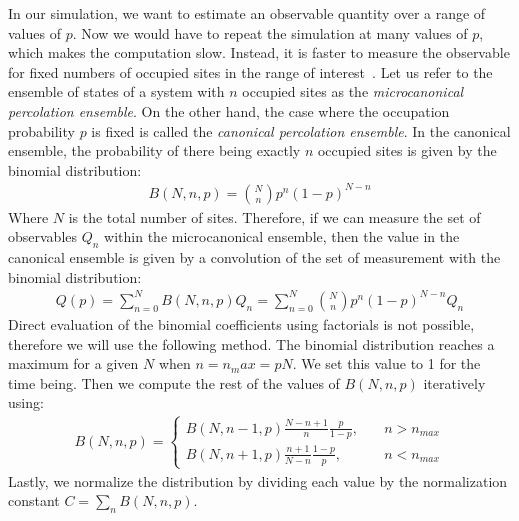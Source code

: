 In our simulation, we want to estimate an observable quantity over a range of values of $p$. Now we would have to repeat the simulation at many values of $p$, which makes the computation slow. Instead, it is faster to measure the observable for fixed numbers of occupied sites in the range of interest~\cite{Newman_2001}. Let us refer to the ensemble of states of a system with $n$ occupied sites as the \emph{microcanonical percolation ensemble}. On the other hand, the case where the occupation probability $p$ is fixed is called the \emph{canonical percolation ensemble}. In the canonical ensemble, the probability of there being exactly $n$ occupied sites is given by the binomial distribution:
\begin{align}
B(N, n, p) = {N \choose n}p^n(1-p)^{N-n}
\end{align}   
Where $N$ is the total number of sites. Therefore, if we can measure the set of observables $Q_n$ within the microcanonical ensemble, then the value in the canonical ensemble is given by a convolution of the set of measurement with the binomial distribution:
\begin{align}
Q(p) = \sum_{n=0}^N B(N, n, p)Q_n = \sum_{n=0}^N{N \choose n}p^n(1-p)^{N-n}Q_n
\end{align}
Direct evaluation of the binomial coefficients using factorials is not possible, therefore we will use the following method. The binomial distribution reaches a maximum for a given $N$ when $n = n_max = pN$. We set this value to 1 for the time being. Then we compute the rest of the values of $B(N, n, p)$ iteratively using:
\begin{align}
B(N, n, p) = 
	\begin{cases}
	B(N, n-1, p)\frac{N-n+1}{n}\frac{p}{1-p}, &\quad n>n_{max}\\
	B(N, n+1, p)\frac{n+1}{N-n}\frac{1-p}{p}, &\quad n<n_{max}
	\end{cases}
\end{align}
Lastly, we normalize the distribution by dividing each value by the normalization constant $C = \sum_n B(N, n, p)$.

